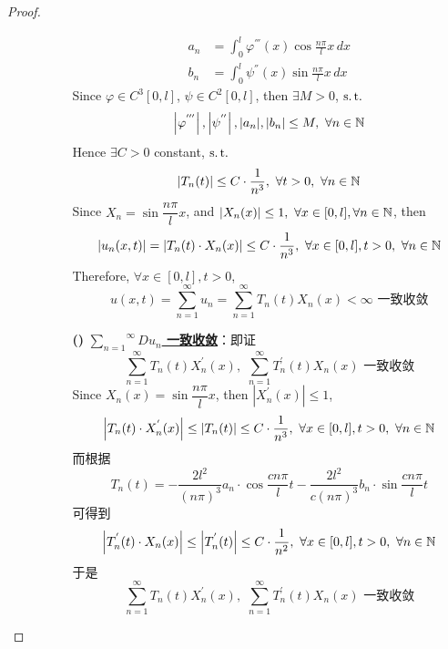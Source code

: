 \begin{thm}
\begin{proof}
\begin{itemize}
\begin{enumerate}
\begin{enumerate}
\begin{align*}
							a_n &= \int_{0}^l \varphi^{'''}(x) \cos \frac{n\pi}{l} x \, dx \\
							b_n &= \int_{0}^l \psi^{''}(x) \sin \frac{n\pi}{l} x \, dx
						\end{align*}
						Since $\varphi \in C^3[0 , l]$, $\psi \in C^2[0 , l]$, then $\exists M > 0$, $\operatorname{s.t.}$
						\[ \left| \varphi^{'''} \right| , \left| \psi^{''} \right| ,  | a_n | , |b_n| \leq M , \,\, \forall n \in \mathbb{N} \]
						Hence $\exists C > 0$ constant, $\operatorname{s.t.}$
						\begin{align*}
							\left| T_n(t) \right| \leq C \cdot \frac{1}{n^3} , \,\, \forall t > 0 , \,\, \forall n \in \mathbb{N}
						\end{align*}
						Since $X_n = \sin \dfrac{n\pi}{l} x$, and $\left| X_n(x) \right| \leq 1 , \,\, \forall x \in [0 , l] , \forall n \in \mathbb{N}$, then
						\[ \left| u_n(x , t) \right| = \left| T_n(t) \cdot X_n(x) \right| \leq C \cdot \frac{1}{n^3} , \,\, \forall x \in [0 , l], t > 0 , \,\, \forall n \in \mathbb{N} \]
						Therefore, $\forall x \in [0 , l] , t > 0$, 
						\[ u(x , t) = \sum_{n = 1}^{\infty} u_n = \sum_{n = 1}^{\infty} T_n(t) X_n(x) < \infty \,\, \text{一致收敛} \]
						
						\vspace*{10em}
						
						\item[\textbf{(\rmnum{2})}]\textbf{\underline{$\overset{\infty}{\underset{n = 1}{\sum}} Du_n$ 一致收敛}}：即证
						\[ \sum_{n = 1}^{\infty} T_n(t) X_{n}^{'}(x) , \,\, \sum_{n = 1}^{\infty} T_{n}^{'}(t) X_n(x) \,\, \text{一致收敛} \]
						Since $X_n(x) = \sin \dfrac{n\pi}{l} x$, then $\left| X_{n}^{'}(x) \right| \leq 1$, 
						\[ \left| T_n(t) \cdot X_{n}^{'}(x) \right| \leq \left| T_{n}(t) \right| \leq C \cdot \frac{1}{n^3} , \,\, \forall x \in [0 , l], t > 0 , \,\, \forall n \in \mathbb{N} \]
						而根据
						\[ T_n(t) = -\frac{2l^2}{(n \pi)^3} a_n \cdot \cos \frac{cn\pi}{l} t - \frac{2l^2}{c(n\pi)^3} b_n \cdot \sin \frac{cn\pi}{l} t \]
						可得到
						\[ \left| T_{n}^{'}(t) \cdot X_{n}(x) \right| \leq \left| T_{n}^{'}(t) \right| \leq C \cdot \frac{1}{n^2} , \,\, \forall x \in [0 , l] , t > 0 , \,\, \forall n \in \mathbb{N} \]
						于是
						\[ \sum_{n = 1}^{\infty} T_n(t) X_{n}^{'}(x) , \,\, \sum_{n = 1}^{\infty} T_{n}^{'}(t) X_n(x) \,\, \text{一致收敛} \]
						
						\newpage
						

\end{enumerate}
\end{enumerate}
\end{itemize}
\end{proof}
\end{thm}
